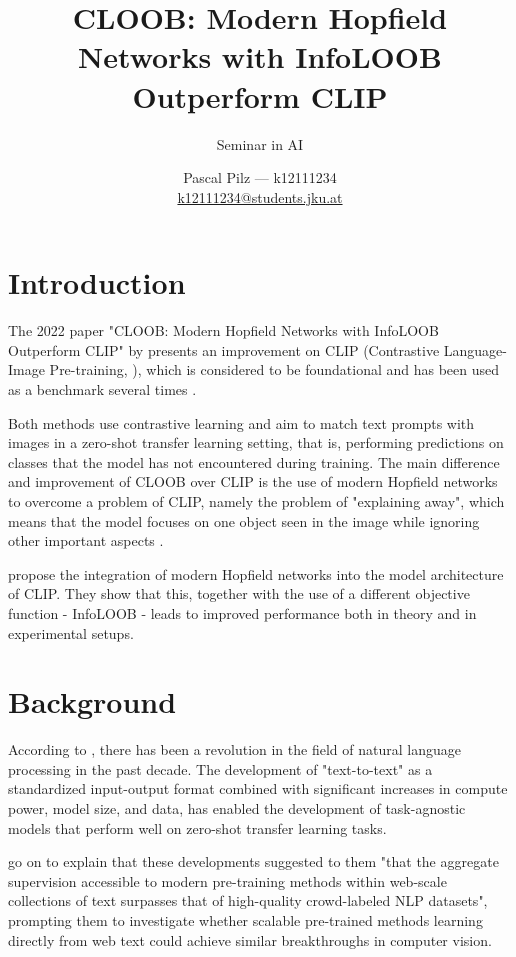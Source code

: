 \documentclass{scrarticle}
\title{CLOOB: Modern Hopfield Networks with InfoLOOB Outperform CLIP}
\subtitle{Seminar in AI}
\author{%
  Pascal Pilz --- k12111234 \\
  \href{mailto:k12111234@students.jku.at}{k12111234@students.jku.at}}
\begin{document}
\maketitle

\section{Introduction}

The 2022 paper "CLOOB: Modern Hopfield Networks with InfoLOOB Outperform CLIP" by \citet{cloob} presents an improvement on CLIP (Contrastive Language-Image Pre-training, \citet{clip}), which is considered to be foundational and has been used as a benchmark several times \cite{cloob,foundational}.

Both methods use contrastive learning and aim to match text prompts with images in a zero-shot transfer learning setting, that is, performing predictions on classes that the model has not encountered during training. The main difference and improvement of CLOOB over CLIP is the use of modern Hopfield networks to overcome a problem of CLIP, namely the problem of "explaining away", which means that the model focuses on one object seen in the image while ignoring other important aspects \cite{cloob,explaining_away}. 

\citet{cloob} propose the integration of modern Hopfield networks into the model architecture of CLIP. They show that this, together with the use of a different objective function - InfoLOOB - leads to improved performance both in theory and in experimental setups.

\section{Background}

According to \citet{clip}, there has been a revolution in the field of natural language processing in the past decade. The development of "text-to-text" as a standardized input-output format combined with significant increases in compute power, model size, and data, has enabled the development of task-agnostic models that perform well on zero-shot transfer learning tasks.

\citet{clip} go on to explain that these developments suggested to them "that the aggregate supervision accessible to modern pre-training methods within web-scale collections of text surpasses that of high-quality crowd-labeled NLP datasets", prompting them to investigate whether scalable pre-trained methods learning directly from web text could achieve similar breakthroughs in computer vision.
\end{document}
